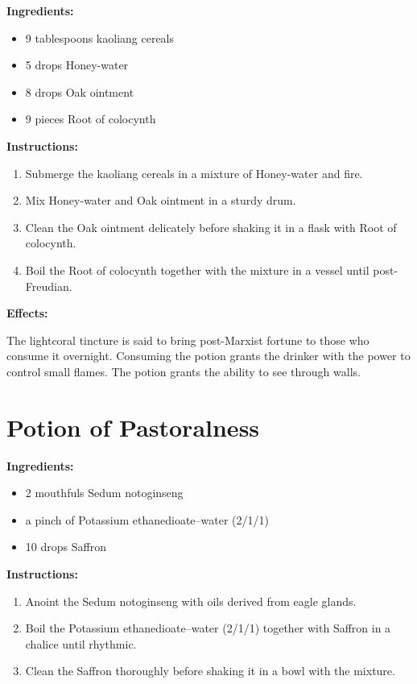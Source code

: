 \documentclass{article}
\begin{document}
\textbf{Ingredients:}

\begin{itemize}
  \item 9 tablespoons kaoliang cereals
  \item 5 drops Honey-water
  \item 8 drops Oak ointment
  \item 9 pieces Root of colocynth
\end{itemize}

\textbf{Instructions:}

\begin{enumerate}
  \item Submerge the kaoliang cereals in a mixture of Honey-water and fire.
  \item Mix Honey-water and Oak ointment in a sturdy drum.
  \item Clean the Oak ointment delicately before shaking it in a flask with Root of colocynth.
  \item Boil the Root of colocynth together with the mixture in a vessel until post-Freudian.
\end{enumerate}

\textbf{Effects:}

The lightcoral tincture is said to bring post-Marxist fortune to those who consume it overnight. Consuming the potion grants the drinker with the power to control small flames. The potion grants the ability to see through walls.

\newpage
\section*{Potion of Pastoralness}

\textbf{Ingredients:}

\begin{itemize}
  \item 2 mouthfuls Sedum notoginseng
  \item a pinch of Potassium ethanedioate--water (2/1/1)
  \item 10 drops Saffron
\end{itemize}

\textbf{Instructions:}

\begin{enumerate}
  \item Anoint the Sedum notoginseng with oils derived from eagle glands.
  \item Boil the Potassium ethanedioate--water (2/1/1) together with Saffron in a chalice until rhythmic.
  \item Clean the Saffron thoroughly before shaking it in a bowl with the mixture.
\end{enumerate}
\end{document}
